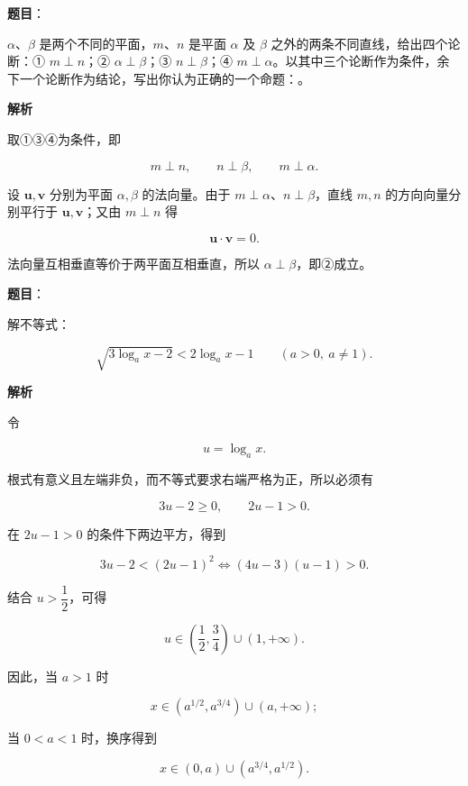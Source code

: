 \begin{answer}

\textbf{题目}：

$\alpha$、$\beta$ 是两个不同的平面，$m$、$n$ 是平面 $\alpha$ 及 $\beta$ 之外的两条不同直线，给出四个论断：① $m\perp n$；② $\alpha\perp\beta$；③ $n\perp\beta$；④ $m\perp\alpha$。以其中三个论断作为条件，余下一个论断作为结论，写出你认为正确的一个命题：\gkblank{}。

\textbf{解析}

取①③④为条件，即

\nopagebreak[4]
\[
m\perp n,\qquad n\perp\beta,\qquad m\perp\alpha.
\]

设 $\mathbf u,\mathbf v$ 分别为平面 $\alpha,\beta$ 的法向量。由于 $m\perp\alpha$、$n\perp\beta$，直线 $m,n$ 的方向向量分别平行于 $\mathbf u,\mathbf v$；又由 $m\perp n$ 得

\nopagebreak[4]
\[
\mathbf u\cdot\mathbf v=0.
\]

法向量互相垂直等价于两平面互相垂直，所以 $\alpha\perp\beta$，即②成立。


\end{answer}
\begin{answer}

\textbf{题目}：

解不等式：

\nopagebreak[4]
\[
\sqrt{3\log_a x-2}<2\log_a x-1\qquad(a>0,\ a\ne1).
\]

\textbf{解析}

令

\nopagebreak[4]
\[
u=\log_a x.
\]

根式有意义且左端非负，而不等式要求右端严格为正，所以必须有

\nopagebreak[4]
\[
3u-2\ge0,\qquad 2u-1>0.
\]

在 $2u-1>0$ 的条件下两边平方，得到

\nopagebreak[4]
\[
3u-2<(2u-1)^2
\Longleftrightarrow
(4u-3)(u-1)>0.
\]

结合 $u>\dfrac12$，可得

\nopagebreak[4]
\[
u\in\left(\frac12,\frac34\right)\cup(1,+\infty).
\]

因此，当 $a>1$ 时

\nopagebreak[4]
\[
x\in\left(a^{1/2},a^{3/4}\right)\cup(a,+\infty);
\]

当 $0<a<1$ 时，换序得到

\nopagebreak[4]
\[
x\in(0,a)\cup\left(a^{3/4},a^{1/2}\right).
\]


\end{answer}
